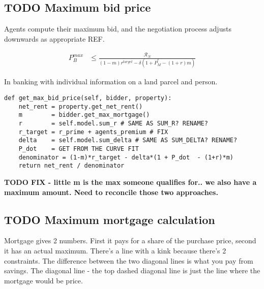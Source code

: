 \subsection{TODO Maximum bid price}

Agents compute their maximum bid, and the negotiation process adjusts downwards as appropriate REF.

\begin{eqnarray}
P_B^{max} & \le    \frac{\mathcal{R}_N}{(1-m)r^{target}-\delta \left(1 + \dot P_M^e - (1+r)m\right)} \label{eqn-bid-price} \end{eqnarray}

In banking with individual information on a land parcel and person.
\begin{lstlisting}
def get_max_bid_price(self, bidder, property):
    net_rent = property.get_net_rent()
    m        = bidder.get_max_mortgage()
    r        = self.model.sum_r # SAME AS SUM_R? RENAME?
    r_target = r_prime + agents_premium # FIX
    delta    = self.model.sum_delta # SAME AS SUM_DELTA? RENAME?
    P_dot    = GET FROM THE CURVE FIT
    denominator = (1-m)*r_target - delta*(1 + P_dot  - (1+r)*m)
    return net_rent / denominator   
\end{lstlisting}

\textbf{TODO FIX - little m is the max someone qualifies for.. we also have a maximum amount. Need to reconcile those two approaches.}
 
\subsection{TODO Maximum mortgage calculation}


Mortgage gives 2 numbers. First it pays for a share of the purchase price, second it has an actual maximum. There's a line with a kink because there's 2 constraints.  The difference between the two diagonal lines is what you pay from savings. 
The diagonal line - the top dashed diagonal line is just the line where the mortgage would be price.

